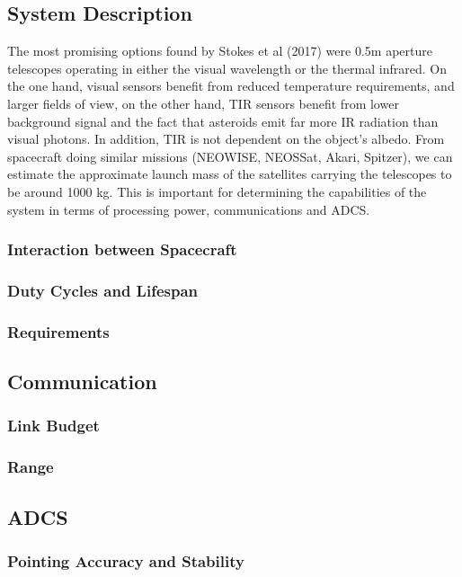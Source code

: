 \documentclass[a4paper,10pt]{article}
\begin{document}
\subsection{System Description}
The most promising options found by Stokes et al (2017) were 0.5m aperture telescopes operating in either the visual wavelength or the thermal infrared. On the one hand, visual sensors benefit from reduced temperature requirements, and larger fields of view, on the other hand, TIR sensors benefit from lower background signal and the fact that asteroids emit far more IR radiation than visual photons. In addition, TIR is not dependent on the object's albedo. From spacecraft doing similar missions (NEOWISE, NEOSSat, Akari, Spitzer), we can estimate the approximate launch mass of the satellites carrying the telescopes to be around 1000 kg. This is important for determining the capabilities of the system in terms of processing power, communications and ADCS. 
\subsubsection{Interaction between Spacecraft}

\subsubsection{Duty Cycles and Lifespan}

\subsubsection{Requirements}


\subsection{Communication}
\subsubsection{Link Budget}
\subsubsection{Range}

\subsection{ADCS}
\subsubsection{Pointing Accuracy and Stability}
\end{document}
